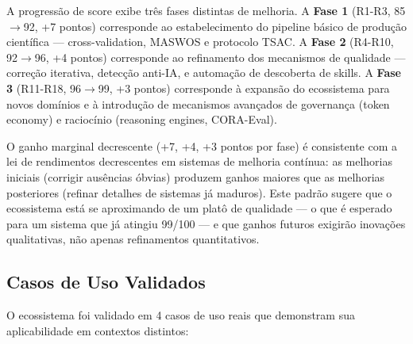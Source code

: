 A progressão de score exibe três fases distintas de melhoria. A \textbf{Fase 1} (R1-R3, 85$\rightarrow$92, +7 pontos) corresponde ao estabelecimento do pipeline básico de produção científica --- cross-validation, MASWOS e protocolo TSAC. A \textbf{Fase 2} (R4-R10, 92$\rightarrow$96, +4 pontos) corresponde ao refinamento dos mecanismos de qualidade --- correção iterativa, detecção anti-IA, e automação de descoberta de skills. A \textbf{Fase 3} (R11-R18, 96$\rightarrow$99, +3 pontos) corresponde à expansão do ecossistema para novos domínios e à introdução de mecanismos avançados de governança (token economy) e raciocínio (reasoning engines, CORA-Eval).

O ganho marginal decrescente (+7, +4, +3 pontos por fase) é consistente com a lei de rendimentos decrescentes em sistemas de melhoria contínua: as melhorias iniciais (corrigir ausências óbvias) produzem ganhos maiores que as melhorias posteriores (refinar detalhes de sistemas já maduros). Este padrão sugere que o ecossistema está se aproximando de um platô de qualidade --- o que é esperado para um sistema que já atingiu 99/100 --- e que ganhos futuros exigirão inovações qualitativas, não apenas refinamentos quantitativos.

\subsection{Casos de Uso Validados}

O ecossistema foi validado em 4 casos de uso reais que demonstram sua aplicabilidade em contextos distintos:

